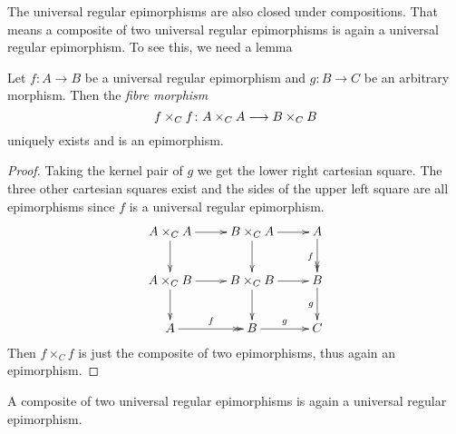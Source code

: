   The universal regular epimorphisms are also closed under compositions. That means a composite of two universal regular epimorphisms is again a universal regular epimorphism. To see this, we need a lemma
  \begin{lem}\label{lem:fibre morphism of descent morphism}
    Let $f\colon A\to B$ be a universal regular epimorphism and $g\colon B\to C$ be an arbitrary morphism. Then the \emph{fibre morphism}
    \begin{equation*}
      f\times_Cf\colon A\times_CA\longrightarrow B\times_CB
    \end{equation*}
    uniquely exists and is an epimorphism.
  \end{lem}
  \begin{proof}
    Taking the kernel pair of $g$ we get the lower right cartesian square. The three other cartesian squares exist and the sides of the upper left square are all epimorphisms since $f$ is a universal regular epimorphism.
    \begin{displaymath}
      \xymatrix{
         A\times_CA\ar[r]\ar[d] & B\times_CA\ar[r]\ar[d] & A\ar@{->>}[d]_{f} \\
         A\times_CB\ar[r]\ar[d] & B\times_CB\ar[r]\ar[d] & B\ar[d]_{g} \\
         A\ar@{->>}[r]^{f} & B\ar[r]^{g} & C
      }
    \end{displaymath}
    Then $f\times_Cf$ is just the composite of two epimorphisms, thus again an epimorphism.
  \end{proof}
  \begin{prop}
    A composite of two universal regular epimorphisms is again a universal regular epimorphism.
  \end{prop}
